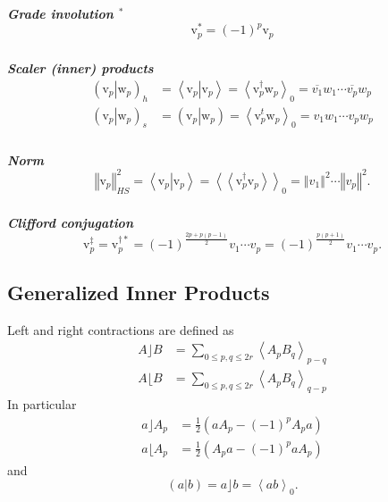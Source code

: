 \documentclass[aps,preprint]{revtex4}%
\begin{document}
\subparagraph{Grade involution $^{\ast}$
\begin{equation}
\mathrm{v}_{p}^{\ast}=\left(  -1\right)  ^{p}\mathrm{v}_{p}%
\end{equation}
}

\subparagraph{Scaler (inner) products%
\begin{align}
\left(  \left.  \mathrm{v}_{p}\right\vert \mathrm{w}_{p}\right)  _{h}  &
=\left\langle \left.  \mathrm{v}_{p}\right\vert \mathrm{v}_{p}\right\rangle
=\left\langle \mathrm{v}_{p}^{\dagger}\mathrm{w}_{p}\right\rangle
_{0}=\overline{v_{1}}w_{1}\cdots\overline{v_{p}}w_{p}\\
\left(  \left.  \mathrm{v}_{p}\right\vert \mathrm{w}_{p}\right)  _{s}  &
=\left(  \left.  \mathrm{v}_{p}\right\vert \mathrm{w}_{p}\right)
=\left\langle \mathrm{v}_{p}^{t}\mathrm{w}_{p}\right\rangle _{0}=v_{1}%
w_{1}\cdots v_{p}w_{p}%
\end{align}
}

\subparagraph{Norm
\begin{equation}
\left\Vert \mathrm{v}_{p}\right\Vert _{HS}^{2}=\left\langle \left.
\mathrm{v}_{p}\right\vert \mathrm{v}_{p}\right\rangle =\left\langle
\left\langle \mathrm{v}_{p}^{\dagger}\mathrm{v}_{p}\right\rangle \right\rangle
_{0}=\left\Vert v_{1}\right\Vert ^{2}\cdots\left\Vert v_{p}\right\Vert ^{2}.
\end{equation}
}

\subparagraph{Clifford conjugation
\begin{equation}
\mathrm{v}_{p}^{\ddagger}=\mathrm{v}_{p}^{\dagger\ast}=\left(  -1\right)
^{\frac{2p+p\left(  p-1\right)  }{2}}v_{1}\cdots v_{p}=\left(  -1\right)
^{\frac{p\left(  p+1\right)  }{2}}v_{1}\cdots v_{p}.
\end{equation}
}

\subsection{Generalized Inner Products}

Left and right contractions are defined as
\begin{align}
A\rfloor B  &  =\sum_{0\leq p,q\leq2r}\left\langle A_{p}B_{q}\right\rangle
_{p-q}\\
A\lfloor B  &  =\sum_{0\leq p,q\leq2r}\left\langle A_{p}B_{q}\right\rangle
_{q-p}%
\end{align}
In particular
\begin{align}
a\rfloor A_{p}  &  =\frac{1}{2}\left(  aA_{p}-\left(  -1\right)  ^{p}%
A_{p}a\right) \\
a\lfloor A_{p}  &  =\frac{1}{2}\left(  A_{p}a-\left(  -1\right)  ^{p}%
aA_{p}\right)
\end{align}
and
\begin{equation}
\left(  \left.  a\right\vert b\right)  =a\rfloor b=\left\langle
ab\right\rangle _{0}.
\end{equation}
\end{document}
